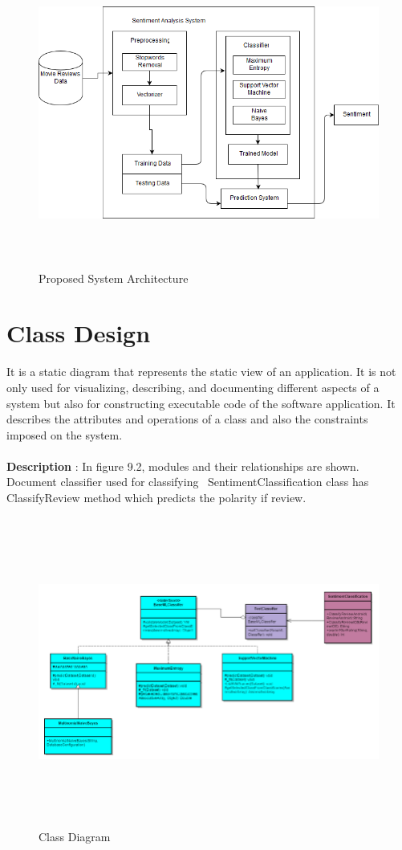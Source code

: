 \documentclass[oneside,a4paper,12pt]{pictreport}
\begin{document}
\begin{figure}[!h]
\includegraphics[width=5.7in,height=4.0in]{archi.png}
\caption{Proposed System Architecture}
\end{figure}

\section{Class Design}
It is a static diagram that represents the static view of an application. It is not only used for visualizing, describing, and documenting different aspects of a system but also for constructing executable code of the software application. It describes the attributes and operations of a class and also the constraints imposed on the system.\\\\
\textbf{Description} : In figure 9.2, modules and their relationships are shown. Document classifier used for classifying \
SentimentClassification class has ClassifyReview method which predicts the polarity if review.

\begin{figure}[h!]
\includegraphics[width=4.5in,height=4.0in]{Sentiment_Analysis_class_diagram.png}
\caption{Class Diagram}
\end{figure}
\newpage
\end{document}
